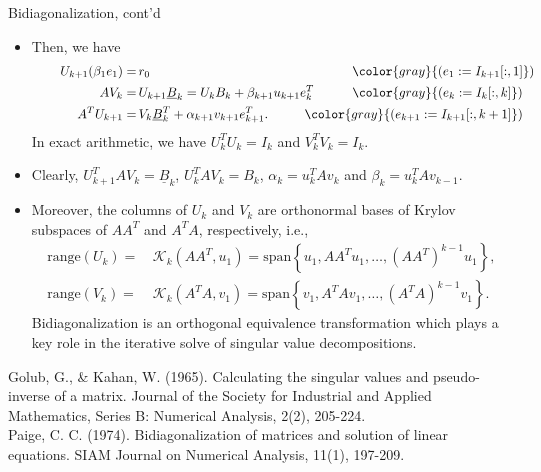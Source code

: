 \documentclass[t,usepdftitle=false]{beamer}
\begin{document}
\begin{frame}{Bidiagonalization, cont'd}
\begin{itemize}
\item[]Then, we have\vspace{-.1cm}
\begin{align*}
\hspace*{.75cm}
U_{k+1}(\beta_1e_1)=&\,r_0
\hspace{5.55cm}{\color{gray}{(e_1:=I_{k+1}[:,1]})}\\
AV_k=&\,U_{k+1}\underline{B}_k=U_kB_k+\beta_{k+1}u_{k+1}e_k^T
\hspace{1.05cm}{\color{gray}{(e_k:=I_{k}[:,k]})}\\
A^TU_{k+1}=&\,V_k\underline{B}_k^T+\alpha_{k+1}v_{k+1}e_{k+1}^T.
\hspace{1cm}{\color{gray}{(e_{k+1}:=I_{k+1}[:,k+1]})}
\end{align*}
In exact arithmetic, we have $U_k^TU_k=I_k$ and $V_k^TV_k=I_k$.
\item[]Clearly, $U_{k+1}^TAV_k=\underline{B}_k$, $U_k^TAV_k=B_k$, $\alpha_k=u_k^TAv_k$ and $\beta_k=u_{k}^TAv_{k-1}$.
\item[]Moreover, the columns of $U_k$ and $V_k$ are orthonormal bases of Krylov subspaces of $AA^T$ and $A^TA$, respectively, i.e.,
\begin{align*}
\text{range}(U_k)=&\,\mathcal{K}_k(AA^T,u_1)=
\text{span}\left\{u_1,AA^Tu_1,\dots,(AA^T)^{k-1}u_1\right\},\\
\text{range}(V_k)=&\,\mathcal{K}_k(A^TA,v_1)=
\text{span}\left\{v_1,A^TAv_1,\dots,(A^TA)^{k-1}v_1\right\}.
\end{align*}
Bidiagonalization is an orthogonal equivalence transformation which plays a key role in the iterative solve of singular value decompositions.\smallskip
\end{itemize}
\tiny{Golub, G., \& Kahan, W. (1965). Calculating the singular values and pseudo-inverse of a matrix. Journal of the Society for Industrial and Applied Mathematics, Series B: Numerical Analysis, 2(2), 205-224.}\tinyskip\\
\tiny{Paige, C. C. (1974). Bidiagonalization of matrices and solution of linear equations. SIAM Journal on Numerical Analysis, 11(1), 197-209.}
\end{frame}
\end{document}
